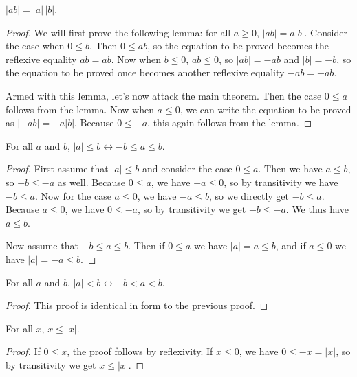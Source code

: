 \documentclass[../math.tex]{subfiles}
\begin{document}
\begin{theorem}
    $|ab| = |a|\,|b|$.
\end{theorem}
\begin{proof}
    We will first prove the following lemma: for all $a \geq 0$, $|ab| = a|b|$.
    Consider the case when $0 \leq b$.  Then $0 \leq ab$, so the equation to be
    proved becomes the reflexive equality $ab = ab$.  Now when $b \leq 0$, $ab
    \leq 0$, so $|ab| = -ab$ and $|b| = -b$, so the equation to be proved once
    becomes another reflexive equality $-ab = -ab$.

    Armed with this lemma, let's now attack the main theorem.  Then the case $0
    \leq a$ follows from the lemma.  Now when $a \leq 0$, we can write the
    equation to be proved as $|-ab| = -a|b|$.  Because $0 \leq -a$, this again
    follows from the lemma.
\end{proof}

\begin{theorem} \label{abs_le}
    For all $a$ and $b$, $|a| \leq b \leftrightarrow -b \leq a \leq b$.
\end{theorem}
\begin{proof}
    First assume that $|a| \leq b$ and consider the case $0 \leq a$.  Then we
    have $a \leq b$, so $-b \leq -a$ as well.  Because $0 \leq a$, we have $-a
    \leq 0$, so by transitivity we have $-b \leq a$.  Now for the case $a \leq
    0$, we have $-a \leq b$, so we directly get $-b \leq a$.  Because $a \leq
    0$, we have $0 \leq -a$, so by transitivity we get $-b \leq -a$.  We thus
    have $a \leq b$.

    Now assume that $-b \leq a \leq b$.  Then if $0 \leq a$ we have $|a| = a
    \leq b$, and if $a \leq 0$ we have $|a| = -a \leq b$.
\end{proof}

\begin{theorem} \label{abs_lt}
    For all $a$ and $b$, $|a| < b \leftrightarrow -b < a < b$.
\end{theorem}
\begin{proof}
    This proof is identical in form to the previous proof.
\end{proof}

\begin{theorem} \label{abs_le_pos}
    For all $x$, $x \leq |x|$.
\end{theorem}
\begin{proof}
    If $0 \leq x$, the proof follows by reflexivity.  If $x \leq 0$, we have $0
    \leq -x = |x|$, so by transitivity we get $x \leq |x|$.
\end{proof}
\end{document}
